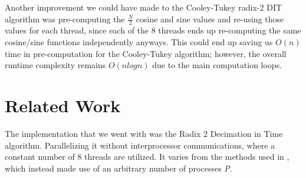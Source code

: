 \documentclass[journal]{IEEEtran}
\begin{document}
	\par{
		Another improvement we could have made to the Cooley-Tukey radix-2 DIT
		algorithm was pre-computing the $\frac{N}{2}$ cosine and sine values and
		re-using those values for each thread, since each of the 8 threads ends 
		up re-computing the same cosine/sine functions independently anyways.
		This could end up saving us $O(n)$ time in pre-computation for the 
		Cooley-Tukey algorithm; however, the overall runtime complexity 
		remains $O(nlogn)$ due to the main computation loops.
	}

\section{Related Work}
	\par{
		The implementation that we went with was the Radix 2 Decimation in Time algorithm. Parallelizing it without 
		interprocessor communications, where a constant number of 8 threads are utilized. It varies from the 
		methods used in \cite{Xie}, which instead made use of an arbitrary number of processes \textit{P}. 
	}
\end{document}
